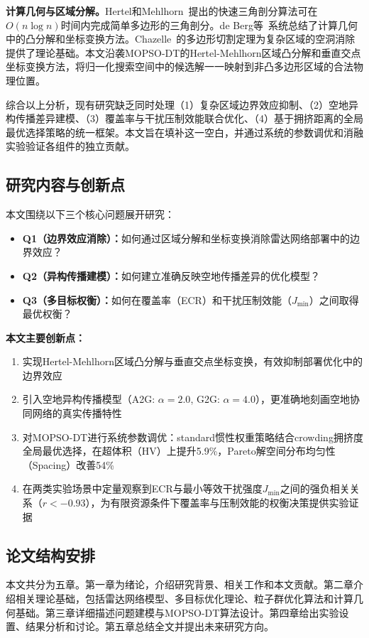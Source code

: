 \textbf{计算几何与区域分解。}Hertel和Mehlhorn~\cite{Hertel1983}提出的快速三角剖分算法可在$O(n \log n)$时间内完成简单多边形的三角剖分。de Berg等~\cite{DeBerg2008}系统总结了计算几何中的凸分解和坐标变换方法。Chazelle~\cite{Chazelle1982}的多边形切割定理为复杂区域的空洞消除提供了理论基础。本文沿袭MOPSO-DT的Hertel-Mehlhorn区域凸分解和垂直交点坐标变换方法，将归一化搜索空间中的候选解一一映射到非凸多边形区域的合法物理位置。

综合以上分析，现有研究缺乏同时处理（1）复杂区域边界效应抑制、（2）空地异构传播差异建模、（3）覆盖率与干扰压制效能联合优化、（4）基于拥挤距离的全局最优选择策略的统一框架。本文旨在填补这一空白，并通过系统的参数调优和消融实验验证各组件的独立贡献。

\subsection{研究内容与创新点}

本文围绕以下三个核心问题展开研究：

\begin{itemize}
    \item \textbf{Q1（边界效应消除）：}如何通过区域分解和坐标变换消除雷达网络部署中的边界效应？
    \item \textbf{Q2（异构传播建模）：}如何建立准确反映空地传播差异的优化模型？
    \item \textbf{Q3（多目标权衡）：}如何在覆盖率（ECR）和干扰压制效能（$J_{\text{min}}$）之间取得最优权衡？
\end{itemize}

\textbf{本文主要创新点：}

\begin{enumerate}
    \item 实现Hertel-Mehlhorn区域凸分解与垂直交点坐标变换，有效抑制部署优化中的边界效应
    \item 引入空地异构传播模型（A2G: $\alpha=2.0$, G2G: $\alpha=4.0$），更准确地刻画空地协同网络的真实传播特性
    \item 对MOPSO-DT进行系统参数调优：standard惯性权重策略结合crowding拥挤度全局最优选择，在超体积（HV）上提升5.9\%，Pareto解空间分布均匀性（Spacing）改善54\%
    \item 在两类实验场景中定量观察到ECR与最小等效干扰强度$J_{\text{min}}$之间的强负相关关系（$r < -0.93$），为有限资源条件下覆盖率与压制效能的权衡决策提供实验证据
\end{enumerate}

\subsection{论文结构安排}

本文共分为五章。第一章为绪论，介绍研究背景、相关工作和本文贡献。第二章介绍相关理论基础，包括雷达网络模型、多目标优化理论、粒子群优化算法和计算几何基础。第三章详细描述问题建模与MOPSO-DT算法设计。第四章给出实验设置、结果分析和讨论。第五章总结全文并提出未来研究方向。
